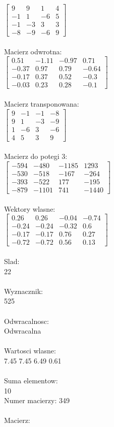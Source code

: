 \documentclass[a4paper,12pt]{article}
\begin{document}
$\begin{bmatrix} 9&9&1&4\\-1&1&-6&5\\-1&-3&3&3\\-8&-9&-6&9 \end{bmatrix}$
\\
\\
Macierz odwrotna:\\

$\begin{bmatrix} 0.51&-1.11&-0.97&0.71\\-0.37&0.97&0.79&-0.64\\-0.17&0.37&0.52&-0.3\\-0.03&0.23&0.28&-0.1 \end{bmatrix}$
\\
\\
Macierz transponowana:\\

$\begin{bmatrix} 9&-1&-1&-8\\9&1&-3&-9\\1&-6&3&-6\\4&5&3&9 \end{bmatrix}$
\\
\\
Macierz do potegi 3:\\

$\begin{bmatrix} -594&-480&-1185&1293\\-530&-518&-167&-264\\-393&-522&177&-195\\-879&-1101&741&-1440 \end{bmatrix}$
\\
\\
Wektory wlasne:\\

$\begin{bmatrix} 0.26&0.26&-0.04&-0.74\\-0.24&-0.24&-0.32&0.6\\-0.17&-0.17&0.76&0.27\\-0.72&-0.72&0.56&0.13 \end{bmatrix}$
\\
\\
Slad:\\
22
\\
\\
Wyznacznik:\\
525
\\
\\
Odwracalnosc:\\
Odwracalna
\\
\\
Wartosci wlasne:\\
7.45 7.45 6.49 0.61
\\
\\
Suma elementow:\\
10
\\
\newpage
Numer macierzy:
349
\\
\\
Macierz:\\
\end{document}

